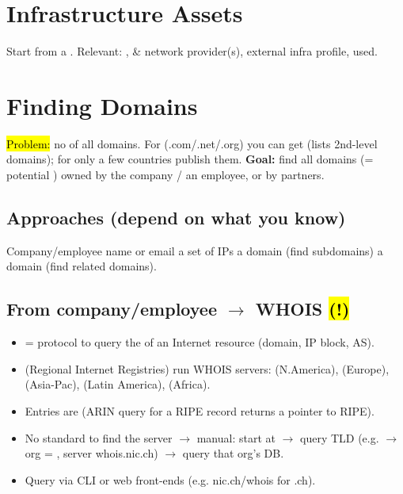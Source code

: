 \section{Infrastructure Assets}
Start from a . Relevant: ,  \& network provider(s), external infra profile,  used.

\section{Finding Domains}
\hl{Problem:} no  of all domains. For  (.com/.net/.org) you can get  (lists 2nd-level domains); for  only a few countries publish them.
\textbf{Goal:} find all domains (= potential ) owned by the company / an employee, or by  partners.

\subsection{Approaches (depend on what you know)}
Company/employee name or email \textbullet{} a set of IPs \textbullet{} a domain (find subdomains) \textbullet{} a domain (find related domains).

\subsection{From company/employee $\to$ WHOIS \hl{(!)}}
\begin{itemize}
\item {} = protocol to query the  of an Internet resource (domain, IP block, AS).
\item {} (Regional Internet Registries) run WHOIS servers:  (N.America),  (Europe),  (Asia-Pac),  (Latin America),  (Africa).
\item Entries are  (ARIN query for a RIPE record returns a pointer to RIPE).
\item No standard to find the  server $\to$ manual: start at  $\to$ query TLD (e.g.  $\to$ org = , server whois.nic.ch) $\to$ query that org's DB.
\item Query via  CLI or web front-ends (e.g. nic.ch/whois for .ch).
\end{itemize}

